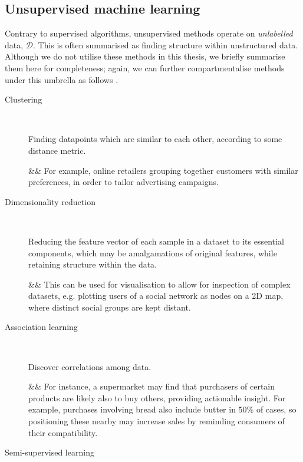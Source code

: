 \subsection{Unsupervised machine learning}

Contrary to supervised algorithms, unsupervised methods operate on \emph{unlabelled} data, $\mathcal{D}$. 
This is often summarised as finding structure within unstructured data.
Although we do not utilise these methods in this thesis, we briefly summarise them here for completeness;
    again, we can further compartmentalise methods under this umbrella as follows \cite{geron2019hands}. 

\begin{description}
    \item[Clustering] \ 
    
    Finding datapoints which are similar to each other, according to some distance metric.
    \begin{easylist}
        && For example, online retailers grouping together customers with similar preferences, in order to tailor advertising campaigns. 
    \end{easylist}
    \item[Dimensionality reduction] \ 
    
    Reducing the feature vector of each sample in a dataset to its essential components,
        which may be amalgamations of original features, while retaining structure within the data.
    \begin{easylist}
        && This can be used for visualisation to allow for inspection of complex datasets, 
        e.g. plotting users of a social network as nodes on a 2D map, where distinct social groups
        are kept distant. 
    \end{easylist}
    \item[Association learning] \ 
    
    Discover correlations among data. 
    \begin{easylist}
        && For instance, a supermarket may find that purchasers of certain products are likely also to buy others, 
            providing actionable insight.
            For example, purchases involving bread also include butter in $50\%$ of cases, 
            so positioning these nearby may increase sales by reminding consumers of their compatibility. 
    \end{easylist}
    \item[Semi-supervised learning] \ 
    

\end{description}
